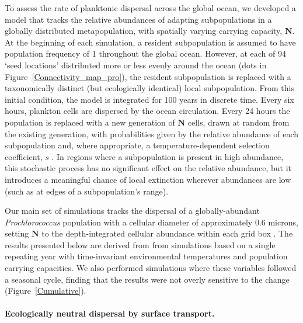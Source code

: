 \documentclass[12pt]{article}
\begin{document}
To assess the rate of planktonic dispersal across the global ocean, we developed a model that tracks the relative abundances of adapting subpopulations in a globally distributed metapopulation, with spatially varying carrying capacity, $\mathbf{N}$. At the beginning of each simulation, a resident subpopulation is assumed to have population frequency of 1 throughout the global ocean. However, at each of 94 `seed locations' distributed more or less evenly around the ocean (dots in Figure~\ref{Connectivity_map_pro}), the resident subpopulation is replaced with a taxonomically distinct (but ecologically identical) local subpopulation. From this initial condition, the model is integrated for 100 years in discrete time. Every six hours, plankton cells are dispersed by the ocean circulation. Every 24 hours the population is replaced with a new generation of $\mathbf{N}$ cells, drawn at random from the existing generation, with probabilities given by the relative abundance of each subpopulation and, where appropriate, a temperature-dependent selection coefficient, $s$ \citep{Cherry:2003}. In regions where a subpopulation is present in high abundance, this stochastic process has no significant effect on the relative abundance, but it introduces a meaningful chance of local extinction wherever abundances are low (such as at edges of a subpopulation's range). 

Our main set of simulations tracks the dispersal of a globally-abundant \textit{Prochlorococcus} population with a cellular diameter of approximately 0.6 microns, setting $\mathbf{N}$ to the depth-integrated cellular abundance within each grid box \citep{Dutkiewicz:2019}. The results presented below are derived from from simulations based on a single repeating year with time-invariant environmental temperatures and population carrying capacities. We also performed simulations where these variables followed a seasonal cycle, finding that the results were not overly sensitive to the change (Figure~\ref{Cumulative}).

\paragraph{Ecologically neutral dispersal by surface transport.}
\end{document}
